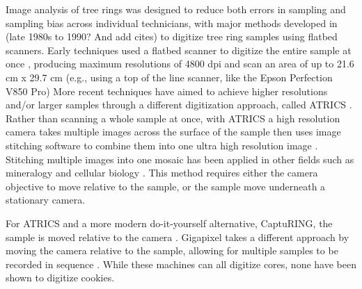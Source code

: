 \documentclass[a4paper,12pt]{article}
\begin{document}
Image analysis of tree rings was designed to reduce both errors in sampling and sampling bias across individual technicians, with major methods developed in (late 1980s to 1990? And add cites) to digitize tree ring samples using flatbed scanners. Early techniques used a flatbed scanner to digitize the entire sample at once \citep{guay_new_1992}, producing maximum resolutions of 4800 dpi and scan an area of up to  21.6 cm x 29.7 cm (e.g., using a top of the line scanner, like the Epson Perfection V850 Pro) %
More recent techniques have aimed to achieve higher resolutions and/or larger samples through a different digitization approach, called ATRICS \citep{levanic_atrics_2007}. %
Rather than scanning a whole sample at once, with ATRICS a high resolution camera takes multiple images across the surface of the sample then uses image stitching software to combine them into one ultra high resolution image \citep{muhlich_stitching_2022}.
Stitching multiple images into one mosaic has been applied in other fields such as mineralogy and cellular biology \citep{ro_image_2021,mohammadi_fast_2024}. 
This method requires either the camera objective to move relative to the sample, or the sample move underneath a stationary camera. 

For ATRICS and a more modern do-it-yourself alternative, CaptuRING, the sample is moved relative to the camera \citep{garcia-hidalgo_capturing_2022}. 
Gigapixel takes a different approach by moving the camera relative to the sample, allowing for multiple samples to be recorded in sequence \citep{griffin_gigapixel_2021}. 
While these machines can all digitize cores, none have been shown to digitize cookies. %
\end{document}
